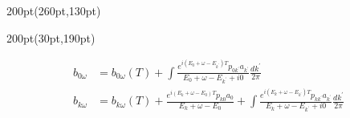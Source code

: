 \begin{frame}
\begin{textblock*}{200pt}(260pt,130pt)
\end{textblock*}





\begin{textblock*}{200pt}(30pt,190pt)
\footnotesize

\begin{align}
b_{0\omega} & = b_{0\omega}(T)
 +\int\frac{e^{i(E_0+\omega-E_{k^\prime})T}p_{0k^\prime}a_{k^\prime}}
{E_0+\omega-E_{k^\prime} + i0} \frac{dk^\prime}{2\pi} \nonumber\\
b_{k\omega} & = b_{k\omega}(T)
 +\frac{e^{i(E_k+\omega-E_0)T}p_{k0}a_0}{E_k+\omega-E_0}
 +\int\frac{e^{i(E_k+\omega-E_{k^\prime})T}p_{kk^\prime}a_{k^\prime}}
{E_k+\omega-E_{k^\prime} + i0} \frac{dk^\prime}{2\pi} \nonumber
\end{align}


\end{textblock*}
\end{frame}
